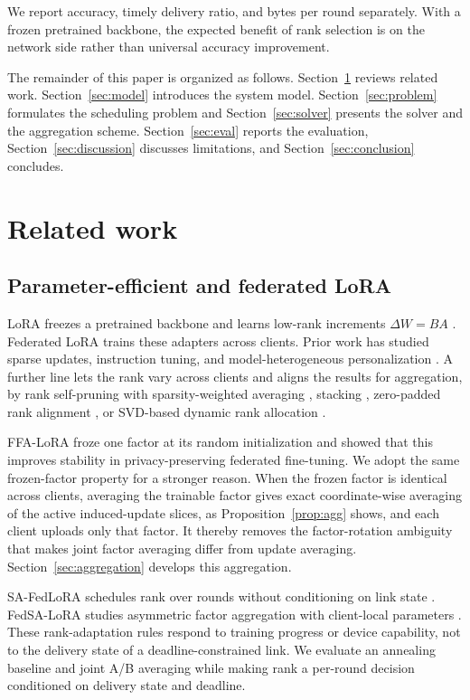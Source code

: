 \documentclass[preprint,12pt]{elsarticle}
\begin{document}
We report accuracy, timely delivery ratio, and bytes per round separately. With a frozen pretrained backbone, the expected benefit of rank selection is on the network side rather than universal accuracy improvement.

The remainder of this paper is organized as follows. Section~\ref{sec:related} reviews related work. Section~\ref{sec:model} introduces the system model. Section~\ref{sec:problem} formulates the scheduling problem and Section~\ref{sec:solver} presents the solver and the aggregation scheme. Section~\ref{sec:eval} reports the evaluation, Section~\ref{sec:discussion} discusses limitations, and Section~\ref{sec:conclusion} concludes.

\section{Related work}
\label{sec:related}

\subsection{Parameter-efficient and federated LoRA}
LoRA freezes a pretrained backbone and learns low-rank increments $\Delta W=BA$ \cite{hu2022lora}. Federated LoRA trains these adapters across clients. Prior work has studied sparse updates, instruction tuning, and model-heterogeneous personalization \cite{babakniya2023slora,zhang2024fedit,yi2026pfedlora}. A further line lets the rank vary across clients and aligns the results for aggregation, by rank self-pruning with sparsity-weighted averaging \cite{cho2024hetlora}, stacking \cite{wang2024flora}, zero-padded rank alignment \cite{fan2025helora}, or SVD-based dynamic rank allocation \cite{wu2026fedara}.

FFA-LoRA \cite{sun2024ffalora} froze one factor at its random initialization and showed that this improves stability in privacy-preserving federated fine-tuning. We adopt the same frozen-factor property for a stronger reason. When the frozen factor is identical across clients, averaging the trainable factor gives exact coordinate-wise averaging of the active induced-update slices, as Proposition~\ref{prop:agg} shows, and each client uploads only that factor. It thereby removes the factor-rotation ambiguity that makes joint factor averaging differ from update averaging. Section~\ref{sec:aggregation} develops this aggregation.

SA-FedLoRA schedules rank over rounds without conditioning on link state \cite{yang2024safedlora}. FedSA-LoRA studies asymmetric factor aggregation with client-local parameters \cite{guo2025fedsalora}. These rank-adaptation rules respond to training progress or device capability, not to the delivery state of a deadline-constrained link. We evaluate an annealing baseline and joint A/B averaging while making rank a per-round decision conditioned on delivery state and deadline.
\end{document}

